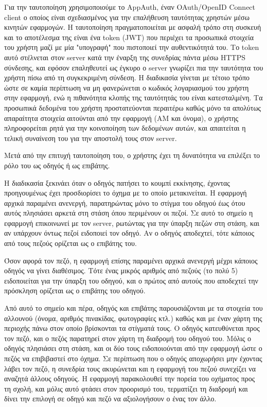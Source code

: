 \documentclass[../thesis.tex]{subfiles}
\begin{document}
Για την ταυτοποίηση χρησιμοποιούμε το AppAuth, έναν OAuth/OpenID Connect client ο οποίος είναι σχεδιασμένος για την επαλήθευση ταυτότητας χρηστών μέσω κινητών εφαρμογών.
Η ταυτοποίηση πραγματοποιείται με ασφαλή τρόπο στη συσκευή και το αποτέλεσμα της είναι ένα token (JWT) που περιέχει τα προσωπικά στοιχεία του χρήστη μαζί με μία "υπογραφή" που πιστοποιεί την αυθεντικότητά του.
Το token αυτό στέλνεται στον server κατά την έναρξη της συνεδρίας πάντα μέσω HTTPS σύνδεσης, και εφόσον επαληθευτεί ως έγκυρο ο server γνωρίζει πια την ταυτότητα του χρήστη πίσω από τη συγκεκριμένη σύνδεση.
Η διαδικασία γίνεται με τέτοιο τρόπο ώστε σε καμία περίπτωση να μη φανερώνεται ο κωδικός λογαριασμού του χρήστη στην εφαρμογή, ενώ η πιθανότητα κλοπής της ταυτότητάς του είναι κατεσταλμένη.
Τα προσωπικά δεδομένα του χρήστη προστατεύονται περαιτέρω καθώς μόνο τα απολύτως απαραίτητα στοιχεία αιτούνται από την εφαρμογή (ΑΜ και όνομα), ο χρήστης πληροφορείται ρητά για την κοινοποίηση των δεδομένων αυτών, και απαιτείται η τελική συναίνεση του για την αποστολή τους στον server.

Μετά από την επιτυχή ταυτοποίηση του, ο χρήστης έχει τη δυνατότητα να επιλέξει το ρόλο του ως οδηγός ή ως επιβάτης.

Η διαδικασία ξεκινάει όταν ο οδηγός πατήσει το κουμπί εκκίνησης, έχοντας προηγουμένως έχει προσδιορίσει το όχημα με το οποίο μετακινείται.
Η εφαρμογή αρχικά παραμένει ανενεργή, παρατηρώντας μόνο το στίγμα του οδηγού έως ότου αυτός πλησιάσει αρκετά στη στάση όπου περιμένουν οι πεζοί.
Σε αυτό το σημείο η εφαρμογή επικοινωνεί με τον server, ρωτώντας για την ύπαρξη πεζών στη στάση, και αν υπάρχουν όντως πεζοί ειδοποιεί τον οδηγό.
Αν ο οδηγός αποδεχτεί, τότε κάποιος από τους πεζούς ορίζεται ως ο επιβάτης του.

Όσον αφορά τον πεζό, η εφαρμογή επίσης παραμένει αρχικά ανενεργή μέχρι κάποιος οδηγός να γίνει διαθέσιμος.
Τότε ένας μικρός αριθμός από πεζούς (το πολύ 5) ειδοποιείται για την ύπαρξη του οδηγού, και ο πρώτος από αυτούς που αποδεχτεί την πρόσκληση ορίζεται ως ο επιβάτης του οδηγού.

Από αυτό το σημείο και πέρα, οδηγός και επιβάτης παρουσιάζονται με τα στοιχεία του αλλουνού (όνομα, αριθμός πινακίδας, φωτογραφίες κτλ.) καθώς και με έναν χάρτη της περιοχής πάνω στον οποίο βρίσκονται τα στίγματά τους.
Ο οδηγός κατευθύνεται προς τον πεζό, και ο πεζός παρατηρεί στον χάρτη τη διαδρομή του οδηγού του.
Μόλις ο οδηγός πλησιάσει στη στάση, και οι δύο τους ειδοποιούνται από την εφαρμογή ώστε ο πεζός να επιβιβαστεί στο όχημα.
Σε περίπτωση που ο οδηγός αποχωρήσει μην έχοντας λάβει τον πεζό, η συνεδρία τους ακυρώνεται και η εφαρμογή του πεζού συνεχίζει να αναζητά άλλους οδηγούς.
Η εφαρμογή παρακολουθεί την πορεία του οχήματος προς τη σχολή, και μόλις αυτό φτάσει στον προορισμό του, τερματίζει τη διαδρομή και δίνει την επιλογή σε οδηγό και πεζό να αξιολογήσουν ο ένας τον άλλο.
\end{document}
